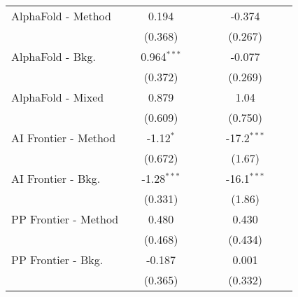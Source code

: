 \begin{tabular}{lcccccccc}
   AlphaFold - Method                             &              & 0.194         &       &       &               & -0.374        &       &   \\   
                                                  &              & (0.368)       &       &       &               & (0.267)       &       &   \\   
   AlphaFold - Bkg.                               &              & 0.964$^{***}$ &       &       &               & -0.077        &       &   \\   
                                                  &              & (0.372)       &       &       &               & (0.269)       &       &   \\   
   AlphaFold - Mixed                              &              & 0.879         &       &       &               & 1.04          &       &   \\   
                                                  &              & (0.609)       &       &       &               & (0.750)       &       &   \\   
   AI Frontier - Method                           &              & -1.12$^{*}$   &       &       &               & -17.2$^{***}$ &       &   \\   
                                                  &              & (0.672)       &       &       &               & (1.67)        &       &   \\   
   AI Frontier - Bkg.                             &              & -1.28$^{***}$ &       &       &               & -16.1$^{***}$ &       &   \\   
                                                  &              & (0.331)       &       &       &               & (1.86)        &       &   \\   
   PP Frontier - Method                           &              & 0.480         &       &       &               & 0.430         &       &   \\   
                                                  &              & (0.468)       &       &       &               & (0.434)       &       &   \\   
   PP Frontier - Bkg.                             &              & -0.187        &       &       &               & 0.001         &       &   \\   
                                                  &              & (0.365)       &       &       &               & (0.332)       &       &   \\   

\end{tabular}
